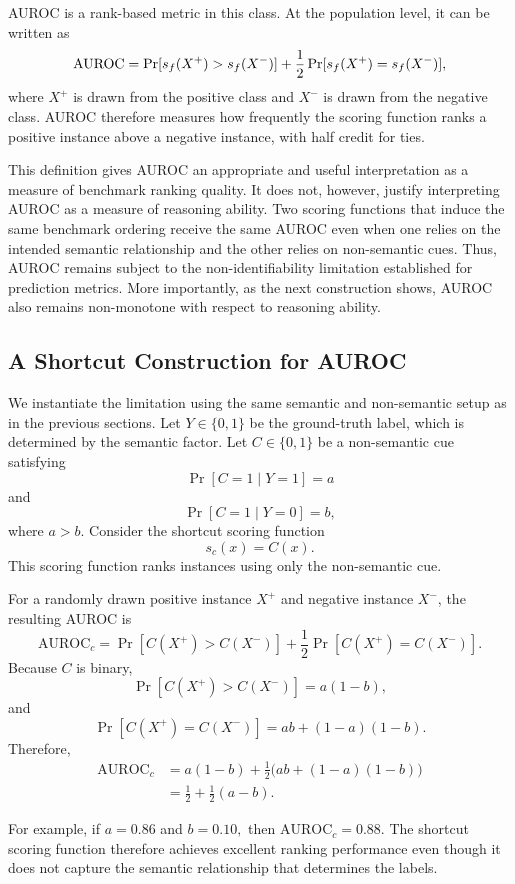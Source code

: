 \documentclass[acmsmall,screen,review,anonymous]{acmart}
\begin{document}
AUROC is a rank-based metric in this class. At the population level, it can
be written as
\[
\mathrm{AUROC}
=
\Pr[s_{f}(X^+)>s_{f}(X^-)]
+
\frac{1}{2}
\Pr[s_{f}(X^+)=s_{f}(X^-)],
\]
where \(X^+\) is drawn from the positive class and \(X^-\) is drawn from the
negative class. AUROC therefore measures how frequently the scoring function
ranks a positive instance above a negative instance, with half credit for
ties.

This definition gives AUROC an appropriate and useful interpretation as a
measure of benchmark ranking quality. It does not, however, justify
interpreting AUROC as a measure of reasoning ability. Two scoring functions
that induce the same benchmark ordering receive the same AUROC even when one
relies on the intended semantic relationship and the other relies on
non-semantic cues. Thus, AUROC remains subject to the non-identifiability
limitation established for prediction metrics. More importantly, as the next
construction shows, AUROC also remains non-monotone with respect to reasoning
ability.

\subsection{A Shortcut Construction for AUROC}

We instantiate the limitation using the same semantic and non-semantic setup
as in the previous sections. Let \(Y\in\{0,1\}\) be the ground-truth label,
which is determined by the semantic factor. Let \(C\in\{0,1\}\) be a
non-semantic cue satisfying
\[
\Pr[C=1\mid Y=1]=a
\]
and
\[
\Pr[C=1\mid Y=0]=b,
\]
where \(a>b\). Consider the shortcut scoring function
\[
s_c(x)=C(x).
\]
This scoring function ranks instances using only the non-semantic cue.

For a randomly drawn positive instance \(X^+\) and negative instance \(X^-\),
the resulting AUROC is
\[
\mathrm{AUROC}_c
=
\Pr[C(X^+)>C(X^-)]
+
\frac{1}{2}\Pr[C(X^+)=C(X^-)].
\]
Because \(C\) is binary,
\[
\Pr[C(X^+)>C(X^-)]
=
a(1-b),
\]
and
\[
\Pr[C(X^+)=C(X^-)]
=
ab+(1-a)(1-b).
\]
Therefore,
\[
\begin{aligned}
\mathrm{AUROC}_c
&=
a(1-b)
+
\frac{1}{2}
\big(
ab+(1-a)(1-b)
\big)
\\
&=
\frac{1}{2}
+
\frac{1}{2}(a-b).
\end{aligned}
\]

For example, if
\(
a=0.86\)
and
\(b=0.10,
\)
then
\(
\mathrm{AUROC}_c=0.88.
\)
The shortcut scoring function therefore achieves excellent ranking
performance even though it does not capture the semantic relationship that
determines the labels.
\end{document}
